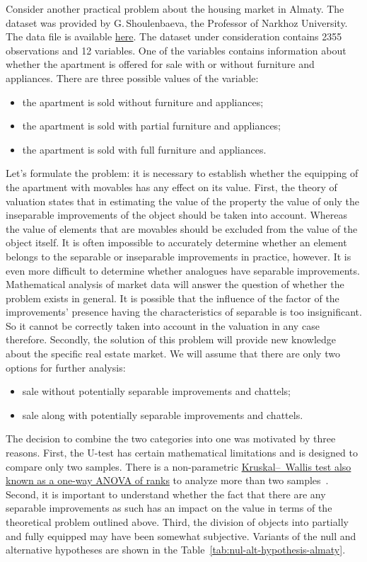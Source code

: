 \documentclass[]{scrreprt}
\begin{document}
Consider another practical problem about the housing market in Almaty. The dataset was provided by G.\,Shoulenbaeva, the Professor of Narkhoz University. The data file is available \href{https://github.com/Kirill-Murashev/AI_for_valuers_book/blob/main/Parts-Chapters/Mann-Whitney-Wilcoxon/almaty-apts-2019-1.csv}{here}\cite{ds:almaty-apts-2019-1}. The dataset under consideration contains 2355 observations and 12 variables. One of the variables contains information about whether the apartment is offered for sale with or without furniture and appliances. There are three possible values of the variable:
\begin{itemize}
	\item the apartment is sold without furniture and appliances;
	\item the apartment is sold with partial furniture and appliances;
	\item the apartment is sold with full furniture and appliances. 
\end{itemize}
%
Let's formulate the problem: it is necessary to establish whether the equipping of the apartment with movables has any effect on its value. First, the theory of valuation states that in estimating the value of the property the value of only the inseparable improvements of the object should be taken into account. Whereas the value of elements that are movables should be excluded from the value of the object itself. It is often impossible to accurately determine whether an element belongs to the separable or inseparable improvements in practice, however. It is even more difficult to determine whether analogues have separable improvements. Mathematical analysis of market data will answer the question of whether the problem exists in general. It is possible that the influence of the factor of the improvements' presence having the characteristics of separable is too insignificant. So it cannot be correctly taken into account in the valuation in any case therefore. Secondly, the solution of this problem will provide new knowledge about the specific real estate market. We will assume that there are only two options for further analysis:
\begin{itemize}
	\item sale without potentially separable improvements and chattels;
	\item sale along with potentially separable improvements and chattels.
\end{itemize}
The decision to combine the two categories into one was motivated by three reasons. First, the U-test has certain mathematical limitations and is designed to compare only two samples. There is a non-parametric \href{https://en.wikipedia.org/wiki/Kruskal–Wallis_one-way_analysis_of_variance}{Kruskal--~Wallis test also known as a one-way ANOVA of ranks} to analyze more than two samples~\cite{Wiki:Kruskal-Wallis}. Second, it is important to understand whether the fact that there are any separable improvements as such has an impact on the value in terms of the theoretical problem outlined above. Third, the division of objects into partially and fully equipped may have been somewhat subjective. Variants of the null and alternative hypotheses are shown in the Table~\ref{tab:nul-alt-hypothesis-almaty}.
\end{document}
